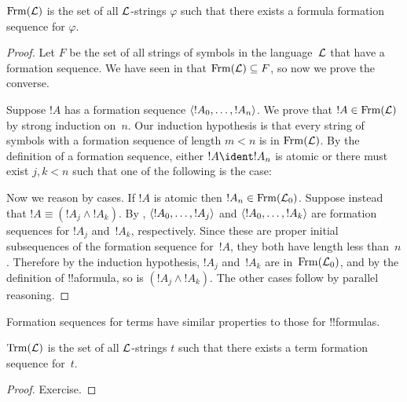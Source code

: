 \documentclass[../../../include/open-logic-section]{subfiles}
\begin{document}
\begin{thm}
$\Frm[L]$ is the set of all $\Lang L$-strings $\varphi$ such that
there exists a formula formation sequence for $\varphi$.
\end{thm}

\begin{proof}
Let $F$ be the set of all strings of symbols in the language~$\Lang L$
that have a formation sequence. We have seen in
 that $\Frm[L] \subseteq F$, so now
we prove the converse.

Suppose $!A$ has a formation sequence $\langle !A_0,\dotsc,!A_n \rangle$.
We prove that $!A \in \Frm[L]$ by strong induction on~$n$.
Our induction hypothesis is that every string of symbols with a
formation sequence of length $m < n$ is in $\Frm[L]$.
By the definition of a formation sequence, either $!A \ident !A_n$ is
atomic or there must exist $j,k < n$ such that one of the
following is the case:
\begin{enumerate}
\end{enumerate}
Now we reason by cases. If $!A$ is atomic then
$!A_n \in \Frm[L_0]$. Suppose instead that
$!A \equiv (!A_j \land !A_k)$. By 
,
$\langle !A_0,\dotsc,!A_j \rangle$ and $\langle !A_0,\dotsc,!A_k \rangle$ are
formation sequences for $!A_j$ and~$!A_k$, respectively. Since
these are proper initial subsequences of the formation sequence
for~$!A$, they both have length less than~$n$. Therefore by
the induction hypothesis, $!A_j$ and~$!A_k$ are in~$\Frm[L_0]$,
and by the definition of !!a{formula}, so is
$(!A_j \land !A_k)$. The other cases follow by parallel
reasoning.
\end{proof}

Formation sequences for terms have similar properties to those
for !!{formula}s.

\begin{prop}
$\Trm[L]$ is the set of all $\Lang L$-strings $t$
such that there exists a term formation sequence for~$t$.
\end{prop}

\begin{proof}
Exercise.
\end{proof}
\end{document}
